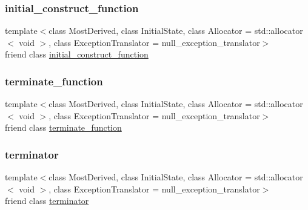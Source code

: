 \subsubsection{\texorpdfstring{initial\+\_\+construct\+\_\+function}{initial\_construct\_function}}
{\footnotesize\ttfamily template$<$class Most\+Derived, class Initial\+State, class Allocator = std\+::allocator$<$ void $>$, class Exception\+Translator = null\+\_\+exception\+\_\+translator$>$ \\
friend class \mbox{\hyperlink{classboost_1_1statechart_1_1state__machine_1_1initial__construct__function}{initial\+\_\+construct\+\_\+function}}\hspace{0.3cm}{\ttfamily [friend]}}

\mbox{\label{classboost_1_1statechart_1_1state__machine_aa71ed4085290df278ffb602ea5329faf}} 
\subsubsection{\texorpdfstring{terminate\+\_\+function}{terminate\_function}}
{\footnotesize\ttfamily template$<$class Most\+Derived, class Initial\+State, class Allocator = std\+::allocator$<$ void $>$, class Exception\+Translator = null\+\_\+exception\+\_\+translator$>$ \\
friend class \mbox{\hyperlink{classboost_1_1statechart_1_1state__machine_1_1terminate__function}{terminate\+\_\+function}}\hspace{0.3cm}{\ttfamily [friend]}}

\mbox{\label{classboost_1_1statechart_1_1state__machine_a8dde3c257059e43db0e48de79ffb385b}} 
\subsubsection{\texorpdfstring{terminator}{terminator}}
{\footnotesize\ttfamily template$<$class Most\+Derived, class Initial\+State, class Allocator = std\+::allocator$<$ void $>$, class Exception\+Translator = null\+\_\+exception\+\_\+translator$>$ \\
friend class \mbox{\hyperlink{classboost_1_1statechart_1_1state__machine_1_1terminator}{terminator}}\hspace{0.3cm}{\ttfamily [friend]}}



